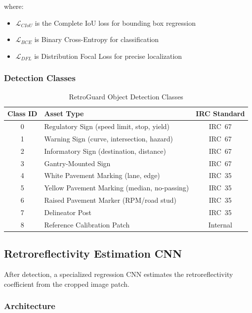 \documentclass[11pt,a4paper]{article}
\begin{document}
where:
\begin{itemize}[noitemsep]
    \item $\mathcal{L}_{CIoU}$ is the Complete IoU loss for bounding box regression
    \item $\mathcal{L}_{BCE}$ is Binary Cross-Entropy for classification
    \item $\mathcal{L}_{DFL}$ is Distribution Focal Loss for precise localization
\end{itemize}

\subsubsection{Detection Classes}

\begin{table}[H]
\centering
\caption{RetroGuard Object Detection Classes}
\label{tab:classes}
\begin{tabular}{@{}clc@{}}
\toprule
\textbf{Class ID} & \textbf{Asset Type} & \textbf{IRC Standard} \\
\midrule
0 & Regulatory Sign (speed limit, stop, yield) & IRC~67 \\
1 & Warning Sign (curve, intersection, hazard) & IRC~67 \\
2 & Informatory Sign (destination, distance) & IRC~67 \\
3 & Gantry-Mounted Sign & IRC~67 \\
4 & White Pavement Marking (lane, edge) & IRC~35 \\
5 & Yellow Pavement Marking (median, no-passing) & IRC~35 \\
6 & Raised Pavement Marker (RPM/road stud) & IRC~35 \\
7 & Delineator Post & IRC~35 \\
8 & Reference Calibration Patch & Internal \\
\bottomrule
\end{tabular}
\end{table}

\subsection{Retroreflectivity Estimation CNN}

After detection, a specialized regression CNN estimates the retroreflectivity coefficient from the cropped image patch.

\subsubsection{Architecture}
\end{document}
